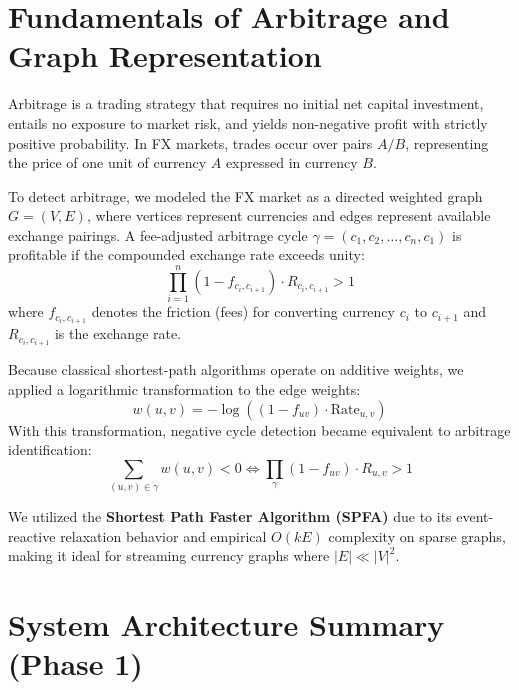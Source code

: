 \documentclass[letterpaper,11pt]{report}
\begin{document}
\section{Fundamentals of Arbitrage and Graph Representation}

Arbitrage is a trading strategy that requires no initial net capital investment, entails no exposure to market risk, and yields non-negative profit with strictly positive probability. In FX markets, trades occur over pairs $A/B$, representing the price of one unit of currency $A$ expressed in currency $B$.

To detect arbitrage, we modeled the FX market as a directed weighted graph $G = (V, E)$, where vertices represent currencies and edges represent available exchange pairings. A fee-adjusted arbitrage cycle $\gamma = (c_1, c_2, \dots, c_n, c_1)$ is profitable if the compounded exchange rate exceeds unity:
$$\prod_{i=1}^{n} (1 - f_{c_i,c_{i+1}}) \cdot R_{c_i,c_{i+1}} > 1$$
where $f_{c_i,c_{i+1}}$ denotes the friction (fees) for converting currency $c_i$ to $c_{i+1}$ and $R_{c_i,c_{i+1}}$ is the exchange rate.

Because classical shortest-path algorithms operate on additive weights, we applied a logarithmic transformation to the edge weights:
$$w(u, v) = - \log((1 - f_{uv}) \cdot \text{Rate}_{u,v})$$
With this transformation, negative cycle detection became equivalent to arbitrage identification:
$$\sum_{(u,v) \in \gamma} w(u,v) < 0 \iff \prod_{\gamma} (1 - f_{uv}) \cdot R_{u,v} > 1$$

We utilized the \textbf{Shortest Path Faster Algorithm (SPFA)} due to its event-reactive relaxation behavior and empirical $O(kE)$ complexity on sparse graphs, making it ideal for streaming currency graphs where $|E| \ll |V|^2$.

\section{System Architecture Summary (Phase 1)}
\end{document}
